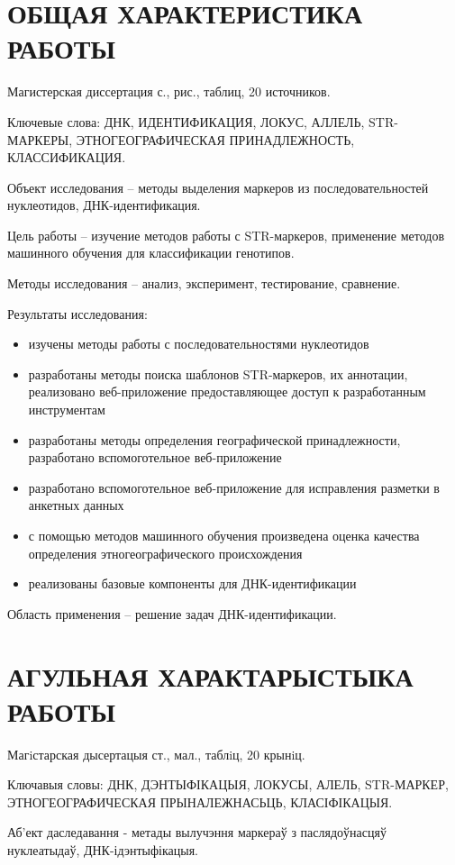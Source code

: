 \chapter*{ОБЩАЯ ХАРАКТЕРИСТИКА РАБОТЫ}
Магистерская диссертация с.,  рис.,  таблиц, 20 источников.

Ключевые слова: ДНК, ИДЕНТИФИКАЦИЯ, ЛОКУС, АЛЛЕЛЬ, STR-МАРКЕРЫ, ЭТНОГЕОГРАФИЧЕСКАЯ ПРИНАДЛЕЖНОСТЬ, КЛАССИФИКАЦИЯ.

Объект исследования – методы выделения маркеров из последовательностей нуклеотидов, ДНК-идентификация.

Цель работы – изучение методов работы с STR-маркеров, применение методов машинного обучения
для классификации генотипов.

Методы исследования – анализ, эксперимент, тестирование, сравнение.

Результаты исследования:
\begin{itemize}
\item изучены методы работы с последовательностями нуклеотидов
\item разработаны методы поиска шаблонов STR-маркеров, их аннотации, реализовано веб-приложение предоставляющее доступ к разработанным инструментам
\item разработаны методы определения географической принадлежности, разработано вспомоготельное веб-приложение
\item разработано вспомоготельное веб-приложение для исправления разметки в анкетных данных
\item с помощью методов машинного обучения произведена оценка качества определения этногеографического происхождения
\item реализованы базовые компоненты для ДНК-идентификации
\end{itemize}

Область применения – решение задач ДНК-идентификации.

\chapter*{АГУЛЬНАЯ ХАРАКТАРЫСТЫКА РАБОТЫ}

Магiстарская дысертацыя  ст.,  мал.,  таблiц, 20 крынiц.

Ключавыя словы: ДНК, ДЭНТЫФІКАЦЫЯ, ЛОКУСЫ, АЛЕЛЬ, STR-МАРКЕР, ЭТНОГЕОГРАФИЧЕСКАЯ ПРЫНАЛЕЖНАСЬЦЬ, КЛАСІФІКАЦЫЯ.

Аб'ект даследавання - метады вылучэння маркераў з паслядоўнасцяў нуклеатыдаў, ДНК-ідэнтыфікацыя.

